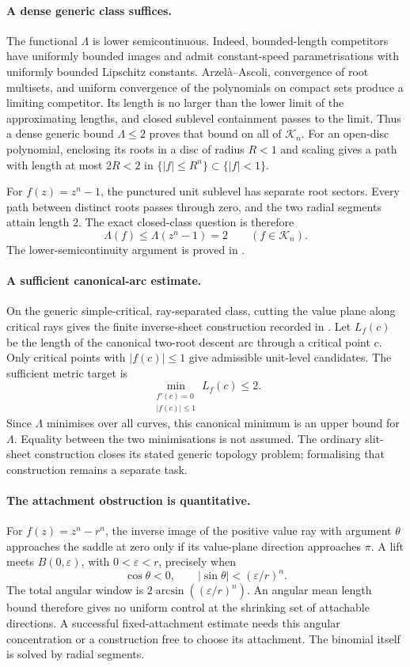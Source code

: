 \documentclass[11pt]{article}
\begin{document}
\paragraph{A dense generic class suffices.}
The functional $\Lambda$ is lower semicontinuous.  Indeed, bounded-length
competitors have uniformly bounded images and admit constant-speed
parametrisations with uniformly bounded Lipschitz constants.  Arzel\`a--Ascoli,
convergence of root multisets, and uniform convergence of the polynomials on
compact sets produce a limiting competitor.  Its length is no larger than
the lower limit of the approximating lengths, and closed sublevel containment
passes to the limit.  Thus a dense generic bound $\Lambda\le2$ proves that
bound on all of $\mathcal K_n$.  For an open-disc polynomial, enclosing its
roots in a disc of radius $R<1$ and scaling gives a path with length at most
$2R<2$ in $\{|f|\le R^n\}\subset\{|f|<1\}$.

For $f(z)=z^n-1$, the punctured unit sublevel has separate root sectors.
Every path between distinct roots passes through zero, and the two radial
segments attain length $2$.  The exact closed-class question is therefore
\[
 \boxed{\Lambda(f)\le\Lambda(z^n-1)=2\qquad(f\in\mathcal K_n).}
\]
The lower-semicontinuity argument is proved in
.

\paragraph{A sufficient canonical-arc estimate.}
On the generic simple-critical, ray-separated class, cutting the value plane
along critical rays gives the finite inverse-sheet construction recorded in
.
Let $L_f(c)$ be the length of the canonical two-root descent arc through a
critical point $c$.  Only critical points with $|f(c)|\le1$ give admissible
unit-level candidates.  The sufficient metric target is
\[
 \min_{\substack{f'(c)=0\\|f(c)|\le1}}L_f(c)\le2.
\]
Since $\Lambda$ minimises over all curves, this canonical minimum is an upper
bound for $\Lambda$.  Equality between the two minimisations is not assumed.
The ordinary slit-sheet construction closes its stated generic topology
problem; formalising that construction remains a separate task.

\paragraph{The attachment obstruction is quantitative.}
For $f(z)=z^n-r^n$, the inverse image of the positive value ray with argument
$\theta$ approaches the saddle at zero only if its value-plane direction
approaches $\pi$.  A lift meets $B(0,\varepsilon)$, with $0<\varepsilon<r$,
precisely when
\[
 \cos\theta<0,\qquad
 |\sin\theta|<(\varepsilon/r)^n.
\]
The total angular window is $2\arcsin((\varepsilon/r)^n)$.  An angular mean
length bound therefore gives no uniform control at the shrinking set of
attachable directions.  A successful fixed-attachment estimate needs this
angular concentration or a construction free to choose its attachment.
The binomial itself is solved by radial segments.
\end{document}
